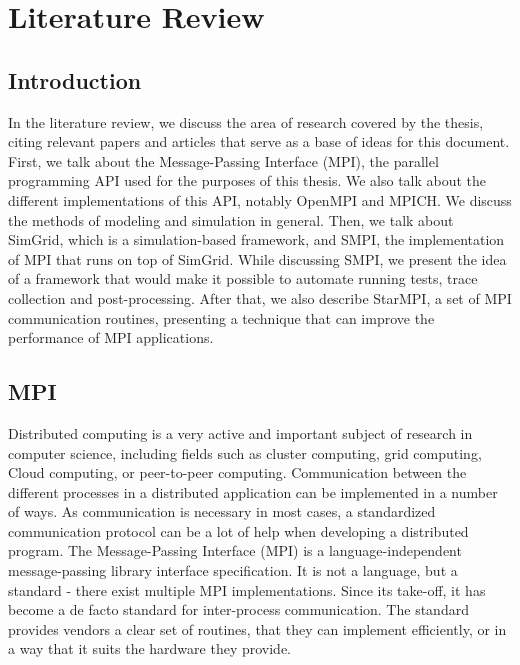 
\chapter{Literature Review}
\label{Chapter2}

\section{Introduction}
In the literature review, we discuss the area of research covered by
the thesis, citing relevant papers and articles that serve as a base
of ideas for this document.\\
First, we talk about the Message-Passing Interface (MPI), the parallel
programming API used for the purposes of this thesis. We also talk
about the different implementations of this API, notably OpenMPI and
MPICH. We discuss the methods of modeling and simulation in general.
Then, we talk about SimGrid, which is a simulation-based
framework, and SMPI, the implementation of MPI that runs on top of
SimGrid. While discussing SMPI, we present the idea of a framework
that would make it possible to automate running tests, trace
collection and post-processing. After that, we also describe StarMPI,
a set of MPI communication routines, presenting a technique that can
improve the performance of MPI applications.
\section{MPI}
Distributed computing is a very active and important subject of research
in computer science, including fields such as cluster computing, grid
computing, Cloud computing, or peer-to-peer computing. Communication
between the different processes in a distributed application can be
implemented in a number of ways. As communication is necessary in most
cases, a standardized communication protocol can be a lot of help when
developing a distributed program. The Message-Passing Interface (MPI)
is a language-independent message-passing library
interface specification. It is not a language, but a standard - there
exist multiple MPI implementations. Since its take-off, it has become
a de facto standard for inter-process communication. The standard
provides vendors a clear set of routines, that they can implement
efficiently, or in a way that it suits the hardware they
provide.\cite{mpif12}
